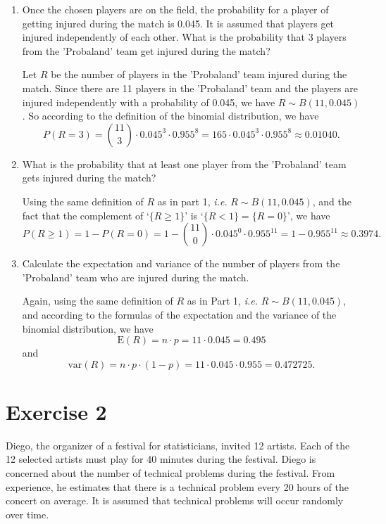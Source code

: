 \documentclass[12pt,thmsa]{article}
\begin{document}
\begin{enumerate}
\item Once the chosen players are on the field, the probability for a player of getting injured during the match is 0.045. It is assumed that players get injured
independently of each other. What is the probability that 3 players from the 'Probaland' team get injured during the match?

Let $R$ be the number of players in the 'Probaland' team injured during the match. Since there are 11 players in the 'Probaland' team and the players are injured independently with a probability of 0.045, we have $R \sim B(11,0.045) $. So according to the definition of the binomial distribution, we have
\begin{equation*}
P(R=3)=\binom{11}{3} \cdot 0.045^3 \cdot 0.955^8 =  165 \cdot 0.045^3 \cdot 0.955^8 \approx 0.01040.
\end{equation*}




\item What is the probability that at least one player from the 'Probaland' team gets injured during the match?

Using the same definition of $R$ as in part 1, 
 {\it i.e.} $R\sim B(11,0.045)$, and the fact that the complement of `$\{R\geq 1\}$' is `$\{R<1\}=\{R=0\}$', we have
\begin{equation*}
P(R\geq 1)= 1- P(R=0) = 1 - \binom{11}{0} \cdot 0.045^0 \cdot 0.955^{11} =  1- 0.955^{11} \approx 0.3974.
\end{equation*}
\item Calculate the expectation and variance of the number of players from the 'Probaland' team who are injured during the match.

Again, using the same definition of $ R $ as in Part 1, {\it i.e.} $R\sim B(11,0.045)$, and according to the formulas of the expectation and the variance of the binomial distribution, we have
$$
\text{E}(R) =n\cdot p= 11 \cdot 0.045 = 0.495
$$
and
$$
\text{var}(R) =  n\cdot p\cdot (1-p)= 11 \cdot 0.045 \cdot 0.955 = 0.472725.
$$
\end{enumerate}




\section*{Exercise 2}
Diego, the organizer of a festival for statisticians, invited 12 artists. Each of the 12 selected artists must play for 40 minutes during the festival. Diego is concerned about the number of technical problems during the festival. From experience, he estimates that there is a technical problem every 20 hours of the concert on average. It is assumed that technical problems will occur randomly over time.
\end{document}
